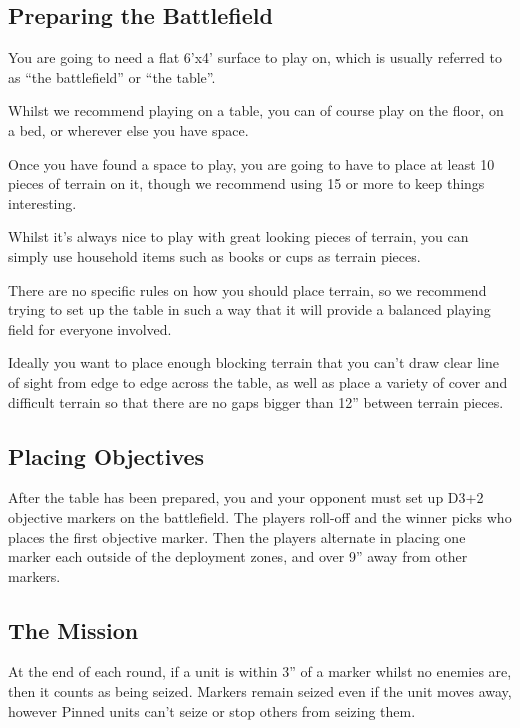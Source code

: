 \documentclass[9pt, a4paper]{extarticle}            %
\begin{document}
\begin{multicols}{2}

\subsection{Preparing the Battlefield}

You are going to need a flat 6’x4’ surface to play on, which is usually referred to as “the battlefield” or “the table”.

Whilst we recommend playing on a table, you can of course play on the floor, on a bed, or wherever else you have space.

Once you have found a space to play, you are going to have to place at least 10 pieces of terrain on it, though we recommend using 15 or more to keep things interesting.

Whilst it’s always nice to play with great looking pieces of terrain, you can simply use household items such as books or cups as terrain pieces.

There are no specific rules on how you should place terrain, so we recommend trying to set up the table in such a way that it will provide a balanced playing field for everyone involved.

Ideally you want to place enough blocking terrain that you can’t draw clear line of sight from edge to edge across the table, as well as place a variety of cover and difficult terrain so that there are no gaps bigger than 12” between terrain pieces.

\subsection{Placing Objectives}

After the table has been prepared, you and your opponent must set up D3+2 objective markers on the battlefield.
The players roll-off and the winner picks who places the first objective marker. Then the players alternate in placing one marker each outside of the deployment zones, and over 9” away from other markers.

\subsection{The Mission}

At the end of each round, if a unit is within 3” of a marker whilst no enemies are, then it counts as being seized.
Markers remain seized even if the unit moves away, however Pinned units can’t seize or stop others from seizing them.


\end{multicols}
\end{document}
